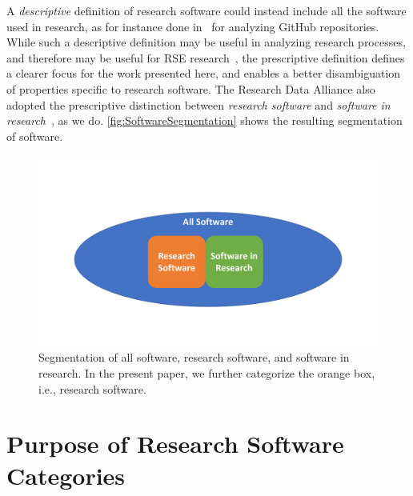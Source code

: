 \documentclass{IEEEcsmag}
\begin{document}
A \textit{descriptive} definition of research software could instead include all the software used in research, as for instance done in~\cite{OSRS2020} for analyzing GitHub repositories.
While such a descriptive definition may be useful in analyzing research processes, and therefore may be useful for RSE research~\cite{RSER2023}, the prescriptive definition defines a clearer focus for the work presented here, and enables a better disambiguation of properties specific to research software. 
The Research Data Alliance also adopted the prescriptive distinction between \emph{research software} and \emph{software in research}~\cite{FAIR4RS2022}, as we do. \autoref{fig:SoftwareSegmentation} shows the resulting segmentation of software.

\begin{figure}[hb]
	\includegraphics[width=\linewidth]{figures/SoftwareSegmentation.pdf}
	\caption{Segmentation of all software, research software, and software in research. In the present paper, we further categorize the orange box, i.e., research software.}
	\label{fig:SoftwareSegmentation}
\end{figure}

\section{Purpose of Research Software Categories}
\end{document}
